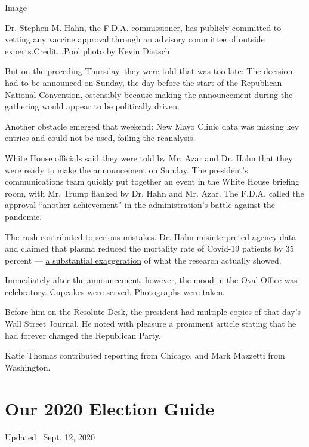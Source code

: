 Image

Dr. Stephen M. Hahn, the F.D.A. commissioner, has publicly committed to
vetting any vaccine approval through an advisory committee of outside
experts.Credit...Pool photo by Kevin Dietsch

But on the preceding Thursday, they were told that was too late: The
decision had to be announced on Sunday, the day before the start of the
Republican National Convention, ostensibly because making the
announcement during the gathering would appear to be politically driven.

Another obstacle emerged that weekend: New Mayo Clinic data was missing
key entries and could not be used, foiling the reanalysis.

White House officials said they were told by Mr. Azar and Dr. Hahn that
they were ready to make the announcement on Sunday. The president's
communications team quickly put together an event in the White House
briefing room, with Mr. Trump flanked by Dr. Hahn and Mr. Azar. The
F.D.A. called the approval
``\href{https://www.fda.gov/news-events/press-announcements/fda-issues-emergency-use-authorization-convalescent-plasma-potential-promising-covid-19-treatment}{another
achievement}'' in the administration's battle against the pandemic.

The rush contributed to serious mistakes. Dr. Hahn misinterpreted agency
data and claimed that plasma reduced the mortality rate of Covid-19
patients by 35 percent ---
\href{https://www.nytimes3xbfgragh.onion/2020/08/24/health/fda-blood-plasma.html}{a
substantial exaggeration} of what the research actually showed.

Immediately after the announcement, however, the mood in the Oval Office
was celebratory. Cupcakes were served. Photographs were taken.

Before him on the Resolute Desk, the president had multiple copies of
that day's Wall Street Journal. He noted with pleasure a prominent
article stating that he had forever changed the Republican Party.

Katie Thomas contributed reporting from Chicago, and Mark Mazzetti from
Washington.

\hypertarget{our-2020-election-guide}{%
\section{Our 2020 Election Guide}\label{our-2020-election-guide}}

Updated ~Sept. 12, 2020

